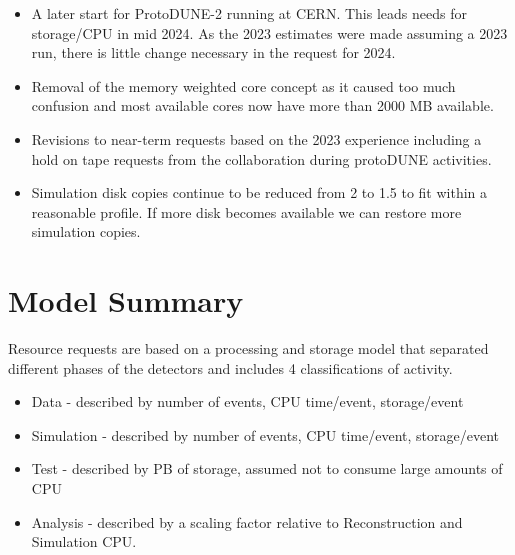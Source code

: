 \documentclass[12pt]{article}
\begin{document}
\begin{itemize}
\item A later start for ProtoDUNE-2 running at CERN. This leads needs for storage/CPU in mid 2024. As the 2023 estimates were made assuming a 2023 run, there is little change necessary in the request for 2024. 

\item Removal of the memory weighted core concept as it caused too much confusion and most available cores now have more than 2000 MB available. 
\item Revisions to near-term requests based on the 2023 experience including a hold on tape requests from the collaboration during protoDUNE activities. 
\item Simulation disk copies continue to be reduced from 2 to 1.5 to fit within a reasonable profile.  If more disk becomes available we can restore more simulation copies.  
\end{itemize}

\section{Model Summary}

Resource requests are based on a processing and storage model that separated different phases of the detectors and includes 4 classifications of activity.

\begin{itemize}
\item Data - described by number of events, CPU time/event, storage/event
\item Simulation - described by number of events,  CPU time/event, storage/event
\item Test - described by PB of storage, assumed not to consume large amounts of CPU
\item Analysis - described by a scaling factor relative to Reconstruction and Simulation CPU.
\end{itemize}
\end{document}
